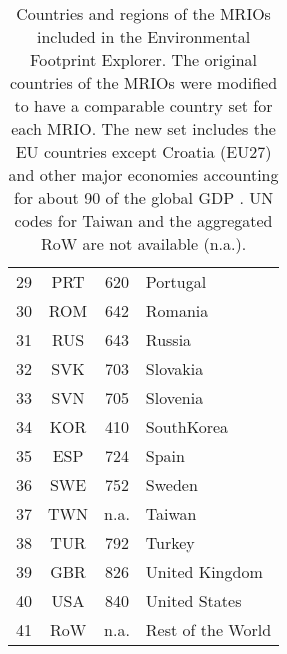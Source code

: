 \begin{table}
\begin{tabular}{ c c c l }
29&PRT & 620 & Portugal\\
30&ROM & 642 & Romania\\
31&RUS & 643 & Russia\\
32&SVK & 703 & Slovakia\\
33&SVN & 705 & Slovenia\\
34&KOR & 410 & SouthKorea\\
35&ESP & 724 & Spain\\
36&SWE & 752 & Sweden\\
37&TWN & n.a. & Taiwan\\
38&TUR & 792 & Turkey\\
39&GBR & 826 & United Kingdom\\
40&USA & 840 & United States\\
41& RoW & n.a. & Rest of the World\\
\end{tabular}

\caption{Countries and regions of the MRIOs included in the Environmental Footprint Explorer. 
The original countries of the MRIOs were modified to have a comparable country set for each MRIO. The new set includes the EU countries except Croatia (EU27) and other major economies accounting for about 90 of the global GDP \cite{Stadler_2014}. UN codes for Taiwan and the aggregated RoW are not available (n.a.).}
\end{table}


